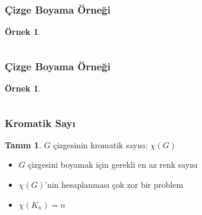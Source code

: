\documentclass[dvipsnames]{beamer}
\theoremstyle{definition}
\newtheorem{tanim}[theorem]{Tanım}
\theoremstyle{example}
\newtheorem{ornek}[theorem]{Örnek}
\theoremstyle{plain}
\begin{document}
\begin{frame}
  \frametitle{Çizge Boyama Örneği}

  \begin{ornek}
    \begin{columns}
      \begin{center}
      \end{center}

      \begin{center}
      \end{center}
    \end{columns}
  \end{ornek}
\end{frame}

\begin{frame}
  \frametitle{Çizge Boyama Örneği}

  \begin{ornek}
    \begin{columns}
      \begin{center}
      \end{center}

      \begin{center}
      \end{center}
    \end{columns}
  \end{ornek}
\end{frame}

\begin{frame}
  \frametitle{Kromatik Sayı}

  \begin{tanim}
    $G$ çizgesinin \alert{kromatik sayısı}: $\chi (G)$
    \begin{itemize}
      \item $G$ çizgesini boyamak için gerekli en az renk sayısı
    \end{itemize}
  \end{tanim}

  \pause
  \begin{itemize}
     \item $\chi (G)$'nin hesaplanması çok zor bir problem
     \item $\chi (K_n) = n$
  \end{itemize}
\end{frame}
\end{document}
